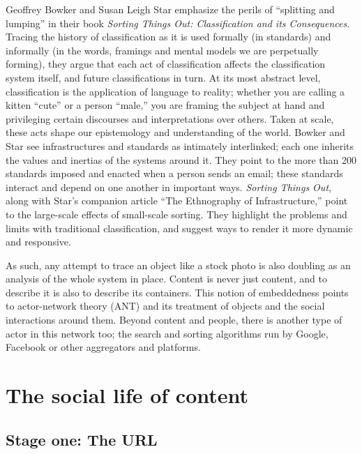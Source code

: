 Geoffrey Bowker and Susan Leigh Star emphasize the perils of ``splitting and lumping'' in their book \emph{Sorting Things Out: Classification and its Consequences}. Tracing the history of classification as it is used formally (in standards) and informally (in the words, framings and mental models we are perpetually forming), they argue that each act of classification affects the classification system itself, and future classifications in turn. At its most abstract level, classification is the application of language to reality; whether you are calling a kitten ``cute'' or a person ``male,'' you are framing the subject at hand and privileging certain discourses and interpretations over others. Taken at scale, these acts shape our epistemology and understanding of the world. Bowker and Star see infrastructures and standards as intimately interlinked; each one inherits the values and inertias of the systems around it. They point to the more than 200 standards imposed and enacted when a person sends an email; these standards interact and depend on one another in important ways.\autocite{bowker_star} \emph{Sorting Things Out}, along with Star's companion article ``The Ethnography of Infrastructure,'' point to the large-scale effects of small-scale sorting. They highlight the problems and limits with traditional classification, and suggest ways to render it more dynamic and responsive.

As such, any attempt to trace an object like a stock photo is also doubling as an analysis of the whole system in place. Content is never just content, and to describe it is also to describe its containers. This notion of embeddedness points to actor-network theory (ANT) and its treatment of objects and the social interactions around them. Beyond content and people, there is another type of actor in this network too; the search and sorting algorithms run by Google, Facebook or other aggregators and platforms.


\section{The social life of content}


\subsection{Stage one: The URL}

